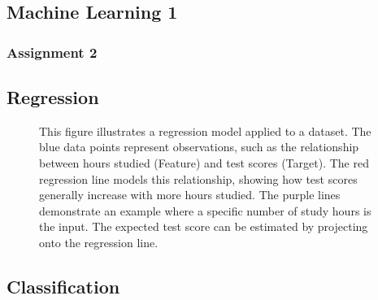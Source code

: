 \documentclass[12pt]{article}
\begin{document}
\subsection{Machine Learning 1}
\subsubsection{Assignment 2}
\subsection{Regression}
\begin{figure}[h]
\centering
{}
    \caption{This figure illustrates a regression model applied to a dataset. The blue data points represent observations, such as the relationship between hours studied (Feature) and test scores (Target). The red regression line models this relationship, showing how test scores generally increase with more hours studied. The purple lines demonstrate an example where a specific number of study hours is the input. The expected test score can be estimated by projecting onto the regression line.}
    \label{fig:regression_example}
\end{figure}


\subsection{Classification}
\end{document}
